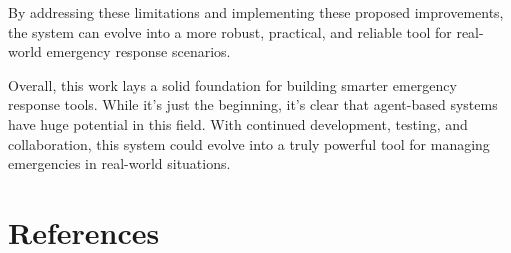 \documentclass[a4paper]{article}
\begin{document}
By addressing these limitations and implementing these proposed improvements, the system can evolve into a more robust, practical, and reliable
 tool for real-world emergency response scenarios.

 Overall, this work lays a solid foundation for building smarter emergency response tools. While it’s just the beginning, it’s clear that
  agent-based systems have huge potential in this field. With continued development, testing, and collaboration, this system could evolve 
  into a truly powerful tool for managing emergencies in real-world situations.


\section{References}


\end{document}
